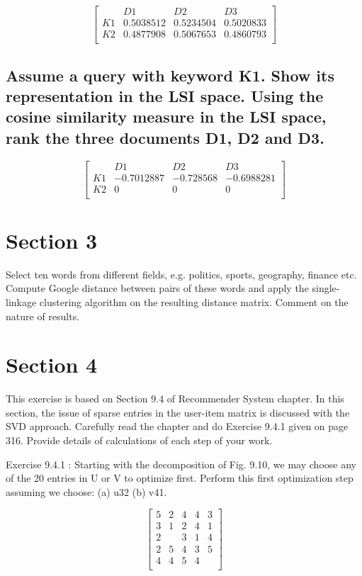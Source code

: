 \documentclass{report}
\begin{document}
\[
  \begin{bmatrix}
       & D1        & D2        & D3        \\
    K1 & 0.5038512 & 0.5234504 & 0.5020833 \\
    K2 & 0.4877908 & 0.5067653 & 0.4860793 \\
  \end{bmatrix}
\]

\section{Assume a query with keyword K1. Show its representation in the LSI space. Using the cosine similarity measure in the LSI space, rank the three documents D1, D2 and D3.}

\[
  \begin{bmatrix}
       & D1         & D2        & D3         \\
    K1 & -0.7012887 & -0.728568 & -0.6988281 \\
    K2 & 0          & 0         & 0          \\
  \end{bmatrix}
\]

\chapter{Section 3}

Select ten words from different fields, e.g. politics, sports, geography, finance etc. Compute Google distance between pairs of these words and apply the single-linkage clustering algorithm on the resulting distance matrix. Comment on the nature of results.

\chapter{Section 4}

This exercise is based on Section 9.4 of Recommender System chapter. In this section, the issue of sparse entries in the user-item matrix is discussed with the SVD approach. Carefully read the chapter and do Exercise 9.4.1 given on page 316. Provide details of calculations of each step of your work.

Exercise 9.4.1 : Starting with the decomposition of Fig. 9.10, we may choose
any of the 20 entries in U or V to optimize first. Perform this first optimization
step assuming we choose: (a) u32 (b) v41.

\[
  \begin{bmatrix}
    5 & 2 & 4 & 4 & 3 \\
    3 & 1 & 2 & 4 & 1 \\
    2 &   & 3 & 1 & 4 \\
    2 & 5 & 4 & 3 & 5 \\
    4 & 4 & 5 & 4 &   \\
  \end{bmatrix}
\]
\end{document}
